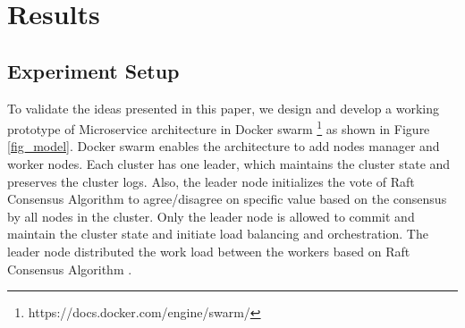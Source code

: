 \documentclass{ieeeaccess}
\begin{document}




 


 \section{Results}
 \label{sec:evaluation}
\subsection{Experiment Setup} 
\label{sec:setup}



To validate the ideas presented in this paper, we design and develop a working prototype of Microservice architecture in Docker swarm \footnote{https://docs.docker.com/engine/swarm/} as shown in Figure \ref{fig_model}. Docker swarm enables the architecture to add nodes manager and worker nodes. Each cluster has one leader, which maintains the cluster state and preserves the cluster logs. Also, the leader node initializes the vote of Raft Consensus Algorithm \cite{ongaro2015raft} to agree/disagree on specific value based on the consensus by all nodes in the cluster. Only the leader node is allowed to commit and maintain the cluster state and initiate load balancing and orchestration. The leader node distributed the work load between the workers based on Raft Consensus Algorithm \cite{ongaro2015raft}. 
\end{document}

